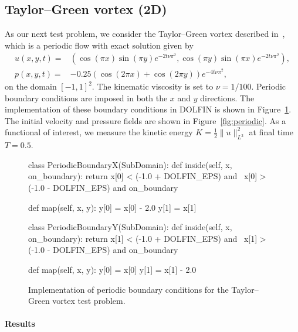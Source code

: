 \subsection{Taylor--Green vortex (2D)}

As our next test problem, we consider the Taylor--Green vortex
described in~\cite{CanutoHussainiQuarteroniEtAl2007}, which is a periodic flow with exact
solution given by
\begin{equation}\label{eq:periodic}
  \begin{split}
    u(x,y,t) = & (\cos (\pi x) \sin (\pi y)  e^{-2t\nu\pi^2}, \cos (\pi y)  \sin (\pi x)  e^{-2t\nu\pi^2}), \\
    p(x,y,t) = & -0.25(\cos(2\pi x ) + \cos(2\pi y ))  e^{-4t\nu\pi^2},
  \end{split}
\end{equation}
on the domain $[-1, 1]^{2}$. The kinematic viscosity is set to $\nu =
1/100$. Periodic boundary conditions are imposed in both the $x$ and
$y$ directions. The implementation of these boundary conditions in
DOLFIN is shown in Figure~\ref{fig:periodic_bcs}. The initial velocity
and pressure fields are shown in Figure~\ref{fig:periodic}. As a
functional of interest, we measure the kinetic energy $K = \frac{1}{2}
\|u\|^2_{L^2}$ at final time $T = 0.5$.

\begin{figure}[htbp]
  \begin{center}
    \begin{python}
class PeriodicBoundaryX(SubDomain):
    def inside(self, x, on_boundary):
        return x[0] < (-1.0 + DOLFIN_EPS) and \
               x[0] > (-1.0 - DOLFIN_EPS) and on_boundary

    def map(self, x, y):
        y[0] = x[0] - 2.0
        y[1] = x[1]

class PeriodicBoundaryY(SubDomain):
    def inside(self, x, on_boundary):
        return x[1] < (-1.0 + DOLFIN_EPS) and \
               x[1] > (-1.0 - DOLFIN_EPS) and on_boundary

    def map(self, x, y):
        y[0] = x[0]
        y[1] = x[1] - 2.0
    \end{python}
    \caption{Implementation of periodic boundary conditions for the
      Taylor--Green vortex test problem.}
    \label{fig:periodic_bcs}
  \end{center}
\end{figure}

\paragraph{Results}

